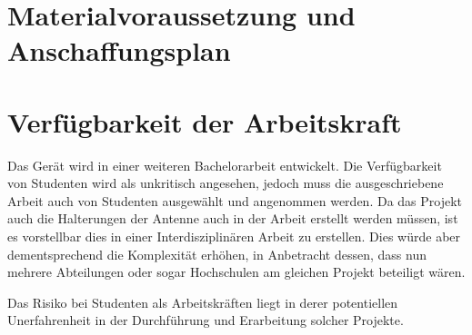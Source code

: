 \chapter{Materialvoraussetzung und Anschaffungsplan}
\label{sec:Materialvoraussetzung_Anschaffungsplan}

\chapter{Verfügbarkeit der Arbeitskraft}
Das Gerät wird in einer weiteren Bachelorarbeit entwickelt. Die Verfügbarkeit von Studenten wird als unkritisch angesehen, jedoch muss die ausgeschriebene Arbeit auch von Studenten ausgewählt und angenommen werden. Da das Projekt auch die Halterungen der Antenne auch in der Arbeit erstellt werden müssen, ist es vorstellbar dies in einer Interdisziplinären Arbeit zu erstellen. Dies würde aber dementsprechend die Komplexität erhöhen, in Anbetracht dessen, dass nun mehrere Abteilungen oder sogar Hochschulen am gleichen Projekt beteiligt wären.

Das Risiko bei Studenten als Arbeitskräften liegt in derer potentiellen Unerfahrenheit in der Durchführung und Erarbeitung solcher Projekte.

